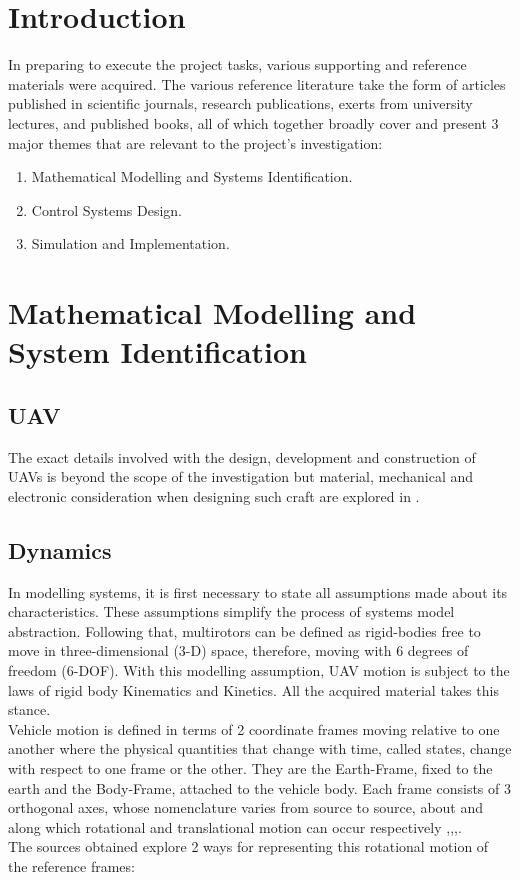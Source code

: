 \documentclass[12pt,a4paper,twoside]{report}
\begin{document}
		\section{Introduction}
		
			In preparing to execute the project tasks, various supporting and reference materials were acquired. The various reference literature take the form of articles published in scientific journals, research publications, exerts from university lectures, and published books, all of which together broadly cover and present 3 major themes that are relevant to the project’s investigation:
		
			\begin{enumerate}
				\item 
					Mathematical Modelling and Systems Identification. 
				\item 
					Control Systems Design.
				\item 
					Simulation and Implementation.
			\end{enumerate}
		
		\section{Mathematical Modelling and System Identification}
			
			\subsection{UAV}
				
				The exact details involved with the design, development and construction of UAVs is beyond the scope of the investigation but material, mechanical and electronic consideration when designing such craft are explored in \cite{12}.
				
			\subsection{Dynamics}
			
				In modelling systems, it is first necessary to state all assumptions made about its characteristics. These assumptions simplify the process of systems model abstraction. Following that, multirotors can be defined as rigid-bodies free to move in three-dimensional (3-D) space, therefore, moving with 6 degrees of freedom (6-DOF). With this modelling assumption, UAV motion is subject to the laws of rigid body Kinematics and Kinetics. All the acquired material takes this stance. 
				\\
				Vehicle motion is defined in terms of 2 coordinate frames moving relative to one another where the physical quantities that change with time, called states, change with respect to one frame or the other. They are the Earth-Frame, fixed to the earth and the Body-Frame, attached to the vehicle body. Each frame consists of 3 orthogonal axes, whose nomenclature varies from source to source, about and along which rotational and translational motion can occur respectively \cite{1},\cite{2},\cite{4},\cite{15}. 
				\\
				The sources obtained explore 2 ways for representing this rotational motion of the reference frames:
				
\end{document}
